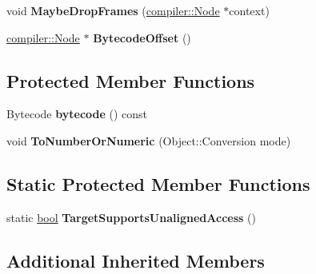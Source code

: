 \begin{DoxyCompactItemize}
\item 
\mbox{\label{classv8_1_1internal_1_1interpreter_1_1InterpreterAssembler_ab1f073b90568a27c1b1e8d5276e1eee6}} 
void {\bfseries Maybe\+Drop\+Frames} (\mbox{\hyperlink{classv8_1_1internal_1_1compiler_1_1Node}{compiler\+::\+Node}} $\ast$context)
\item 
\mbox{\label{classv8_1_1internal_1_1interpreter_1_1InterpreterAssembler_a6d6c761cba9daf57f17c4342ae855757}} 
\mbox{\hyperlink{classv8_1_1internal_1_1compiler_1_1Node}{compiler\+::\+Node}} $\ast$ {\bfseries Bytecode\+Offset} ()
\end{DoxyCompactItemize}
\subsection*{Protected Member Functions}
\begin{DoxyCompactItemize}
\item 
\mbox{\label{classv8_1_1internal_1_1interpreter_1_1InterpreterAssembler_a71258fb35adfd02508984dbdae63737a}} 
Bytecode {\bfseries bytecode} () const
\item 
\mbox{\label{classv8_1_1internal_1_1interpreter_1_1InterpreterAssembler_a8636e281c8ad79b0148426e62435b6f9}} 
void {\bfseries To\+Number\+Or\+Numeric} (Object\+::\+Conversion mode)
\end{DoxyCompactItemize}
\subsection*{Static Protected Member Functions}
\begin{DoxyCompactItemize}
\item 
\mbox{\label{classv8_1_1internal_1_1interpreter_1_1InterpreterAssembler_a8b97c8eafb206f82d81699d4d9a2577a}} 
static \mbox{\hyperlink{classbool}{bool}} {\bfseries Target\+Supports\+Unaligned\+Access} ()
\end{DoxyCompactItemize}
\subsection*{Additional Inherited Members}


